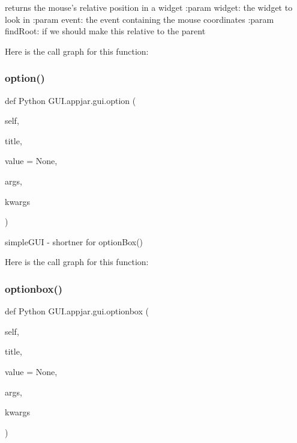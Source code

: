 \begin{DoxyVerb}
\begin{DoxyVerb}returns the mouse's relative position in a widget
:param widget: the widget to look in
:param event: the event containing the mouse coordinates
:param findRoot: if we should make this relative to the parent
\end{DoxyVerb}
 Here is the call graph for this function\+:
\mbox{\label{class_python_01_g_u_i_1_1appjar_1_1gui_a146e85757fb347d225d2a0087c3edeae}} 
\subsubsection{\texorpdfstring{option()}{option()}}
{\footnotesize\ttfamily def Python G\+U\+I.\+appjar.\+gui.\+option (\begin{DoxyParamCaption}\item[{}]{self,  }\item[{}]{title,  }\item[{}]{value = {\ttfamily None},  }\item[{}]{args,  }\item[{}]{kwargs }\end{DoxyParamCaption})}

\begin{DoxyVerb}simpleGUI - shortner for optionBox() \end{DoxyVerb}
 Here is the call graph for this function\+:
\mbox{\label{class_python_01_g_u_i_1_1appjar_1_1gui_afd6b42cfd9bb3436be95fb948bfc4b8c}} 
\subsubsection{\texorpdfstring{optionbox()}{optionbox()}}
{\footnotesize\ttfamily def Python G\+U\+I.\+appjar.\+gui.\+optionbox (\begin{DoxyParamCaption}\item[{}]{self,  }\item[{}]{title,  }\item[{}]{value = {\ttfamily None},  }\item[{}]{args,  }\item[{}]{kwargs }\end{DoxyParamCaption})}


\end{DoxyVerb}

